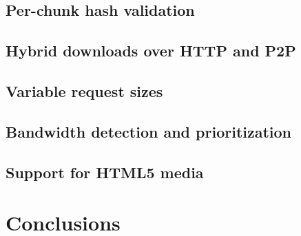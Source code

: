 \documentclass[letterpaper,twocolumn,10pt]{article}
\begin{document}
\subsection{Per-chunk hash validation}


\subsection{Hybrid downloads over HTTP and P2P}


\subsection{Variable request sizes}


\subsection{Bandwidth detection and prioritization}


\subsection{Support for HTML5 media}



\section{Conclusions}



{\footnotesize 
}
\end{document}
